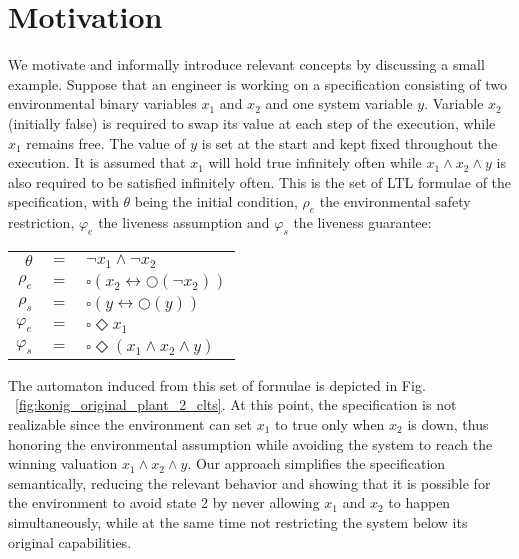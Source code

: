\section{Motivation}\label{sec:motivation}
We motivate and informally introduce relevant concepts by discussing a small example. 
Suppose that an engineer is working on a specification consisting of two environmental 
binary variables $x_1$ and $x_2$ and one system variable $y$. Variable $x_2$ 
(initially false) is required to swap its value at each step of the execution, while $x_1$ 
remains free. The value of $y$ is set at the start and kept fixed throughout the 
execution.
It is assumed that $x_1$ will hold true infinitely often while $x_1 \wedge x_2 \wedge y$ is also required to be satisfied infinitely often. This is the set of LTL formulae of the specification, with $\theta$ being the initial condition, $\rho_e$ the environmental safety restriction, $\varphi_e$ the liveness assumption and $\varphi_s$ the liveness guarantee:
\begin{center}
	\begin{tabular}{ r c l }
		$\theta$& $=$ &$\neg x_1 \wedge \neg x_2$\\
		$\rho_e$& $=$ &$\square(x_2 \leftrightarrow \bigcirc(\neg x_2))$\\
		$\rho_s$& $=$ &$\square(y \leftrightarrow \bigcirc(y))$\\		
		$\varphi_e$& $=$ &$\square \Diamond x_1$\\
		$\varphi_s$& $=$ &$\square \Diamond (x_1 \wedge x_2 \wedge y)$\\
	\end{tabular}
\end{center}
The automaton induced from this set of formulae is depicted in Fig. ~\ref{fig:konig_original_plant_2_clts}. At this point, the specification is not realizable since the environment can set $x_1$ to true only when $x_2$ is down, thus honoring the environmental assumption while avoiding the system to reach the winning valuation $x_1 \wedge x_2 \wedge y$.  
Our approach simplifies the specification semantically, reducing the relevant behavior and showing that it is possible for the environment to avoid state 2 by never allowing $x_1$ and $x_2$ to happen simultaneously, while at the same time not restricting the system below its original capabilities.
